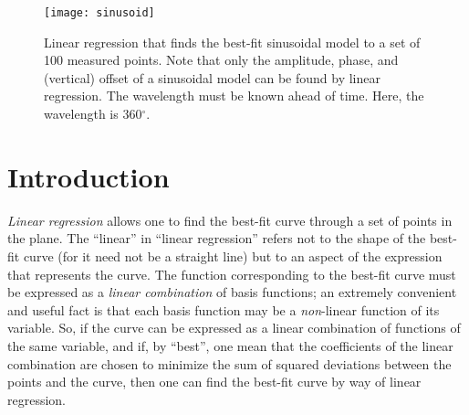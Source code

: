 \documentclass[twocolumn]{article}
\begin{document}
\thispagestyle{fancy}

%
%

\begin{figure}
   \begin{center}
      \texttt{[image: sinusoid]}
      \caption{%
         Linear regression that finds the best-fit sinusoidal model to a set of
         100 measured points.  Note that only the amplitude, phase, and
         (vertical) offset of a sinusoidal model can be found by linear
         regression. The wavelength must be known ahead of time. Here, the
         wavelength is 360$^\circ$.%
      }
      \label{fig:sinusoid}
   \end{center}
\end{figure}

\section{Introduction}

\emph{Linear regression} allows one to find the best-fit curve through a set of
points in the plane. The ``linear'' in ``linear regression'' refers not to the
shape of the best-fit curve (for it need not be a straight line) but to an
aspect of the expression that represents the curve. The function corresponding
to the best-fit curve must be expressed as a \emph{linear combination} of basis
functions; an extremely convenient and useful fact is that each basis function
may be a \emph{non}-linear function of its variable.  So, if the curve can be
expressed as a linear combination of functions of the same variable, and if, by
``best'', one mean that the coefficients of the linear combination are chosen
to minimize the sum of squared deviations between the points and the curve,
then one can find the best-fit curve by way of linear regression.
\end{document}
